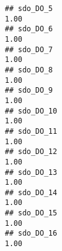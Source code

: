 \documentclass[
]{article}
\begin{document}
\begin{verbatim}
## sdo_DO_5                                                                                                                                                                                                                    1.00
## sdo_DO_6                                                                                                                                                                                                                    1.00
## sdo_DO_7                                                                                                                                                                                                                    1.00
## sdo_DO_8                                                                                                                                                                                                                    1.00
## sdo_DO_9                                                                                                                                                                                                                    1.00
## sdo_DO_10                                                                                                                                                                                                                   1.00
## sdo_DO_11                                                                                                                                                                                                                   1.00
## sdo_DO_12                                                                                                                                                                                                                   1.00
## sdo_DO_13                                                                                                                                                                                                                   1.00
## sdo_DO_14                                                                                                                                                                                                                   1.00
## sdo_DO_15                                                                                                                                                                                                                   1.00
## sdo_DO_16                                                                                                                                                                                                                   1.00

\end{verbatim}
\end{document}

